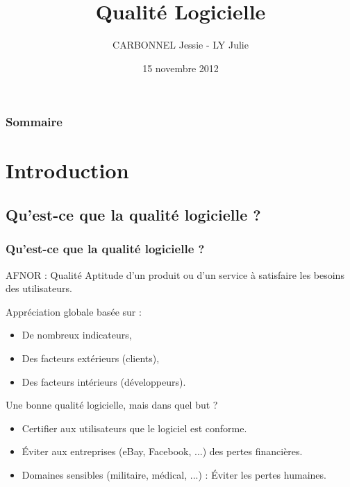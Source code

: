 \documentclass[10pt]{beamer}
\title[Qualité Logicielle]{\bf{Qualité Logicielle}}
\author[CARBONNEL Jessie - LY Julie]{CARBONNEL Jessie - LY Julie}
\institute{Université de Montpellier II}
\date{15 novembre 2012}
\begin{document}
\begin{frame}
    \titlepage
\end{frame}


\begin{frame}
    \frametitle{Sommaire}
    \tableofcontents              
\end{frame}


\section{Introduction}


\small \subsection{Qu'est-ce que la qualité logicielle ?}

\begin{frame}
\frametitle{Qu'est-ce que la qualité logicielle ?}

\pause[2] \begin{block}{AFNOR : Qualité}
	Aptitude d’un produit ou d’un service à satisfaire les besoins des utilisateurs.
\end{block}

\bigskip

\pause[3] Appréciation globale basée sur : 
\begin{itemize}
\item<4->De nombreux indicateurs, 
\item<5->Des facteurs extérieurs (clients), 
\item<6->Des facteurs intérieurs (développeurs). 
\end{itemize}

\bigskip

\pause[7] Une bonne qualité logicielle, mais dans quel but ? 
     \begin{itemize}
     \item<8->Certifier aux utilisateurs que le logiciel est conforme.
     \item<9->\'Eviter aux entreprises (eBay, Facebook, ...) des pertes financières.
     \item<10->Domaines sensibles (militaire, médical, ...) : \'Eviter les pertes humaines. 
\end{itemize}

\end{frame}
\end{document}
